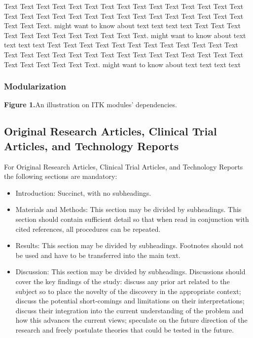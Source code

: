 \documentclass{frontiersENG} %
\begin{document}
Text Text Text Text Text Text  Text Text Text Text Text Text Text Text Text  Text Text Text Text Text Text Text Text Text Text  Text Text Text Text Text Text  Text Text.  \cite{Neuro2013} might want to know about  text text text text Text Text Text Text  Text Text Text Text Text Text  Text Text. \citep{Gene2012} might want to know about  text text text text
Text Text Text Text Text Text  Text Text Text Text Text Text Text Text Text  Text Text Text Text Text Text Text Text Text Text  Text Text Text Text Text Text  Text Text.  \cite{Neurobot2013} might want to know about  text text text text

\subsubsection{Modularization}

\textbf{Figure 1.}{An illustration on ITK modules' dependencies.}\label{fig:01}

\subsection{Original Research Articles, Clinical Trial Articles, and Technology Reports}

For Original Research Articles, Clinical Trial Articles, and Technology Reports the following sections are mandatory:

\begin{itemize}
\item Introduction: Succinct, with no subheadings.
\item Materials and Methods: This section may be divided by subheadings. This section should contain sufficient detail so that when read in conjunction with cited references, all procedures can be repeated.
\item Results: This section may be divided by subheadings. Footnotes should not be used and have to be transferred into the main text.
\item Discussion: This section may be divided by subheadings. Discussions should cover the key findings of the study: discuss any prior art related to the subject so to place the novelty of the discovery in the appropriate context; discuss the potential short-comings and limitations on their interpretations; discuss their integration into the current understanding of the problem and how this advances the current views; speculate on the future direction of the research and freely postulate theories that could be tested in the future.
\end{itemize}
\end{document}
